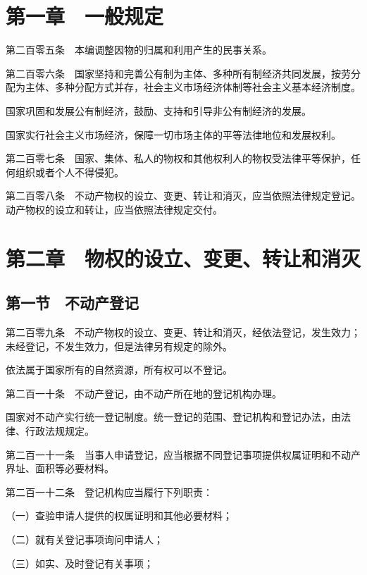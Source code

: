 \documentclass[UTF8,12pt,a4paper]{ctexbook}
\begin{document}
\section*{第一章　一般规定}

第二百零五条　本编调整因物的归属和利用产生的民事关系。

第二百零六条　国家坚持和完善公有制为主体、多种所有制经济共同发展，按劳分配为主体、多种分配方式并存，社会主义市场经济体制等社会主义基本经济制度。

国家巩固和发展公有制经济，鼓励、支持和引导非公有制经济的发展。

国家实行社会主义市场经济，保障一切市场主体的平等法律地位和发展权利。

第二百零七条　国家、集体、私人的物权和其他权利人的物权受法律平等保护，任何组织或者个人不得侵犯。

第二百零八条　不动产物权的设立、变更、转让和消灭，应当依照法律规定登记。动产物权的设立和转让，应当依照法律规定交付。

\section*{第二章　物权的设立、变更、转让和消灭}

\subsection*{第一节　不动产登记}

第二百零九条　不动产物权的设立、变更、转让和消灭，经依法登记，发生效力；未经登记，不发生效力，但是法律另有规定的除外。

依法属于国家所有的自然资源，所有权可以不登记。

第二百一十条　不动产登记，由不动产所在地的登记机构办理。

国家对不动产实行统一登记制度。统一登记的范围、登记机构和登记办法，由法律、行政法规规定。

第二百一十一条　当事人申请登记，应当根据不同登记事项提供权属证明和不动产界址、面积等必要材料。

第二百一十二条　登记机构应当履行下列职责：

（一）查验申请人提供的权属证明和其他必要材料；

（二）就有关登记事项询问申请人；

（三）如实、及时登记有关事项；
\end{document}
